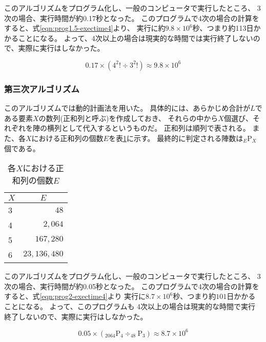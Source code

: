 このアルゴリズムをプログラム化し、一般のコンピュータで実行したところ、
3次の場合、実行時間が約0.17秒となった。
このプログラムで4次の場合の計算をすると、式\ref{eqn:prog1.5-exectime4}より、
実行に約$9.8 \times 10^6$秒、つまり約113日かかることになる。
よって、4次以上の場合は現実的な時間では実行終了しないので、実際に実行はしなかった。

\begin{equation} \label{eqn:prog1.5-exectime4}
0.17 \times (4^2! \div 3^2!) \approx 9.8 \times 10^6
\end{equation}

\subsubsection{第三次アルゴリズム}
このアルゴリズムでは動的計画法を用いた。
具体的には、あらかじめ合計が$L$である要素$X$の数列(正和列と呼ぶ)を作成しておき、
それらの中から$X$個選び、それぞれを陣の横列として代入するというものだ。
正和列は順列で表される。
また、各$X$における正和列の個数$E$を表\ref{tab:ple-each-X}に示す。
最終的に判定される陣数は$_E \mathrm{P} _X$個である。

\begin{table}[htb]
	\begin{center}
	\begin{tabular}{|l|r|}
\hline \hline
\multicolumn{1}{|c|}{$X$} & \multicolumn{1}{|c|}{$E$} \\
\hline \hline
3 & $48$ \\
4 & $2,064$ \\
5 & $167,280$ \\
6 & $23,136,480$ \\
\hline
	\end{tabular}
	\end{center}
	\caption{各$X$における正和列の個数$E$}
	\label{tab:ple-each-X}
\end{table}

このアルゴリズムをプログラム化し、一般のコンピュータで実行したところ、
3次の場合、実行時間が約0.05秒となった。
このプログラムで4次の場合の計算をすると、式\ref{eqn:prog2-exectime4}より
実行に$8.7 \times 10^6$秒、つまり約$101$日かかることになる。
よって、このプログラムも
4次以上の場合は現実的な時間で実行終了しないので、実際に実行はしなかった。

\begin{equation} \label{eqn:prog2-exectime4}
0.05 \times (_{2064} \mathrm{P} _4 \div _{48} \mathrm{P} _3) \approx 8.7 \times 10^6
\end{equation}

